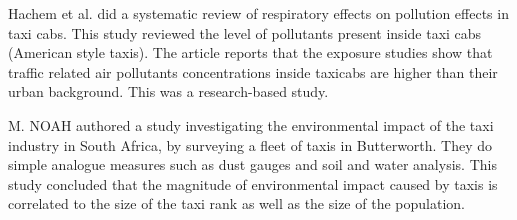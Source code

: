 \vspace{1em}
\noindent
Hachem et al. did a systematic review of respiratory effects on pollution effects in taxi cabs. This study reviewed the level of pollutants present inside taxi cabs (American style taxis). The article reports that the exposure studies show that traffic related air pollutants concentrations inside taxicabs are higher than their urban background\cite{insidetaxismall}. This was a research-based study.

\vspace{1em}
\noindent
M. NOAH authored a study investigating the environmental impact of the taxi industry in South Africa, by surveying a fleet of taxis in Butterworth\cite{Environmentalimpact}. They do simple analogue measures such as dust gauges and soil and water analysis. This study concluded that the magnitude of environmental impact caused by taxis is correlated to the size of the taxi rank as well as the size of the population.

\pagebreak

